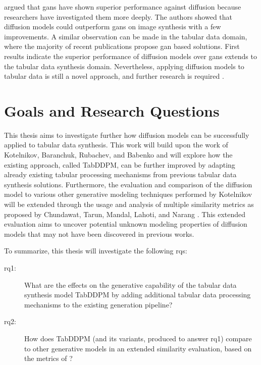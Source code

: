 \cite{dhariwal2021DiffusionModelsBeat} argued that \glspl{gan} have shown superior performance against diffusion because researchers have investigated them more deeply.
The authors showed that diffusion models could outperform \glspl{gan} on image synthesis with a few improvements.
A similar observation can be made in the tabular data domain, where the majority of recent publications propose \gls{gan} based solutions.
First results \cite{kotelnikov2022TabDDPMModellingTabular} indicate the superior performance of diffusion models over \glspl{gan} extends to the tabular data synthesis domain.
Nevertheless, applying diffusion models to tabular data is still a novel approach, and further research is required \cite{borisov2022DeepNeuralNetworks}.


\section{Goals and Research Questions}
\label{ch:intro-goals}
This thesis aims to investigate further how diffusion models can be successfully applied to tabular data synthesis.
This work will build upon the work of Kotelnikov, Baranchuk, Rubachev, and Babenko \cite{kotelnikov2022TabDDPMModellingTabular} and will explore how the existing approach, called TabDDPM, can be further improved by adapting
already existing tabular processing mechanisms from previous tabular data synthesis solutions.
Furthermore, the evaluation and comparison of the diffusion model to various other generative modeling techniques performed by Kotelnikov \etal \cite{kotelnikov2022TabDDPMModellingTabular} will be extended through the usage and analysis
of multiple similarity metrics as proposed by Chundawat, Tarun, Mandal, Lahoti, and Narang \cite{chundawat2022UniversalMetricRobust}.
This extended evaluation aims to uncover potential unknown modeling properties of diffusion models that may not have been discovered in previous works.

To summarize, this thesis will investigate the following \glspl{rq}:

\begin{description}
	\item[\gls{rq}1:] What are the effects on the generative capability of the tabular data synthesis model TabDDPM by adding additional tabular data processing mechanisms to the existing generation pipeline?
	\item[\gls{rq}2:] How does TabDDPM (and its variants, produced to answer \gls{rq}1) compare to other generative models in an extended similarity evaluation, based on the metrics of \cite{chundawat2022UniversalMetricRobust}?
\end{description}

